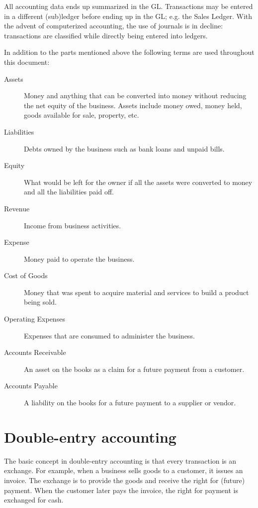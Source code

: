 All accounting data ends up summarized in the \acrshort{GL}. Transactions may be entered in a different (sub)ledger before ending up in the \acrshort{GL}; e.g. the Sales Ledger. With the advent of computerized accounting, the use of journals is in decline: transactions are classified while directly being entered into ledgers.

In addition to the parts mentioned above the following terms are used throughout this document:
\begin{description}
        \item [Assets] Money and anything that can be converted into money without reducing
        the net equity of the business. Assets include money owed, money held, goods
        available for sale, property, etc.
        \item [Liabilities] Debts owned by the business such as bank loans and unpaid bills.
        \item [Equity] What would be left for the owner if all the assets were converted to
        money and all the liabilities paid off.
        \item [Revenue] Income from business activities.
        \item [Expense] Money paid to operate the business.
        \item [Cost of Goods] Money that was spent to acquire material and services to build a product being sold.
        \item [Operating Expenses] Expenses that are consumed to administer the business.
        \item [Accounts Receivable] An asset on the books as a claim for a future payment
        from a customer.
        \item [Accounts Payable] A liability on the books for a future payment to a supplier
        or vendor.
\end{description}

\section{Double-entry accounting}
\label{sec-accounting-double-entry}

The basic concept in double-entry accounting is that every transaction is an exchange. For example, when a business
sells goods to a customer, it issues an invoice.
The exchange is to provide the goods and receive the right for (future) payment. When the customer later pays the invoice, the right for payment is exchanged for cash.

